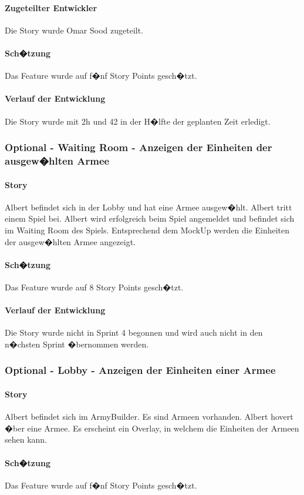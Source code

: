 \documentclass[12pt, titlepage]{scrartcl}
\begin{document}
			\paragraph{Zugeteilter Entwickler} Die Story wurde Omar Sood zugeteilt.
			\paragraph{Sch�tzung}
			Das Feature wurde auf f�nf Story Points gesch�tzt.
			\paragraph{Verlauf der Entwicklung} 
			Die Story wurde mit 2h und 42 in der H�lfte der geplanten Zeit erledigt.
			\subsubsection{Optional - Waiting Room - Anzeigen der Einheiten der ausgew�hlten Armee}
			\paragraph{Story} Albert befindet sich in der Lobby und hat eine Armee ausgew�hlt. Albert tritt einem Spiel bei. Albert wird erfolgreich beim Spiel angemeldet und befindet sich im Waiting Room des Spiels. Entsprechend dem MockUp werden die Einheiten der ausgew�hlten Armee angezeigt.
			\paragraph{Sch�tzung}
			Das Feature wurde auf 8 Story Points gesch�tzt.
			\paragraph{Verlauf der Entwicklung} 
			Die Story wurde nicht in Sprint 4 begonnen und wird auch nicht in den n�chsten Sprint �bernommen werden.
			\subsubsection{Optional - Lobby - Anzeigen der Einheiten einer Armee}
			\paragraph{Story} Albert befindet sich im ArmyBuilder. Es sind Armeen vorhanden. Albert hovert �ber eine Armee. Es erscheint ein Overlay, in welchem die Einheiten der Armeen sehen kann.
			\paragraph{Sch�tzung}
			Das Feature wurde auf f�nf Story Points gesch�tzt.
\end{document}
